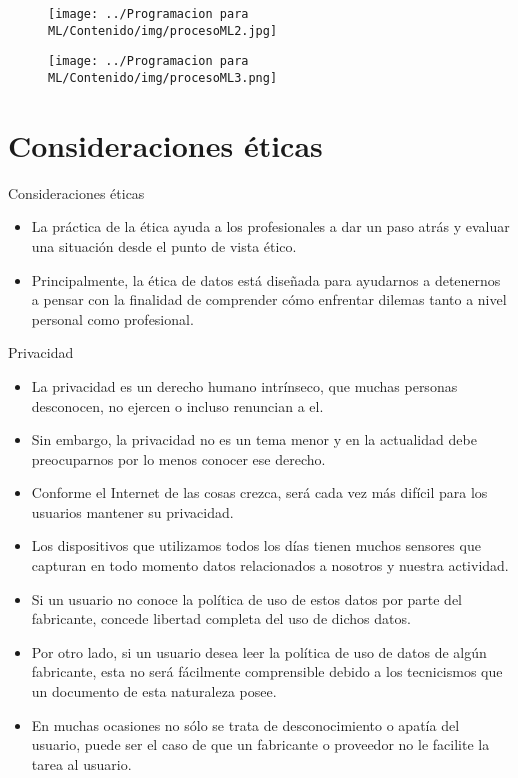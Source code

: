 \documentclass[11pt,aspectratio=169]{beamer}
\begin{document}
\begin{frame}{}
\begin{figure}[H]
	\centering
	\texttt{[image: ../Programacion para ML/Contenido/img/procesoML2.jpg]}
\end{figure}
\end{frame}

\begin{frame}{}
\begin{figure}[H]
	\centering
	\texttt{[image: ../Programacion para ML/Contenido/img/procesoML3.png]}
\end{figure}
\end{frame}

\section{Consideraciones éticas}
\begin{frame}{Consideraciones éticas}
\begin{itemize}
	\item La práctica de la ética ayuda a los profesionales a dar un paso atrás y evaluar una situación desde el punto de vista ético. \pause
	\item Principalmente, la ética de datos está diseñada para ayudarnos a detenernos a pensar con la finalidad de comprender cómo 
		enfrentar dilemas tanto a nivel personal 
como profesional.
\end{itemize}
\end{frame}

\begin{frame}{Privacidad}
\begin{itemize}
	\item La privacidad es un derecho humano intrínseco, que muchas personas desconocen, no ejercen o incluso renuncian a el.\pause
	\item Sin embargo, la privacidad no es un tema menor y en la actualidad debe preocuparnos por lo menos conocer ese derecho.\pause
	\item Conforme el Internet de las cosas crezca, será cada vez más difícil para los usuarios mantener su privacidad. 
	\item Los dispositivos que utilizamos todos los días tienen muchos sensores que capturan en todo momento datos relacionados a 
		nosotros y nuestra actividad. \pause
	\item Si un usuario no conoce la política de uso de estos datos por parte del fabricante, concede libertad completa del uso de 
		dichos datos.\pause
	\item Por otro lado, si un usuario desea leer la política de uso de datos de algún fabricante, esta no será fácilmente comprensible 
		debido a los tecnicismos que un documento de esta naturaleza posee. \pause
	\item En muchas ocasiones no sólo se trata de desconocimiento o apatía del usuario, puede ser el caso de que un fabricante o 
		proveedor no le facilite la tarea al usuario. 
\end{itemize}
\end{frame}
\end{document}
